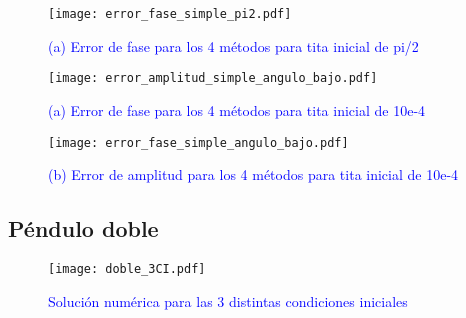 \documentclass[aps,prb,twocolumn,superscriptaddress,floatfix,longbibliography]{revtex4-2}
\newcounter{para}
\begin{document}
\begin{figure}[h]
  \texttt{[image: error\_fase\_simple\_pi2.pdf]}
  \caption{\textcolor{blue}{(a) Error de fase para los 4 métodos para tita inicial de pi/2}}
   \label{fig:error_fase_simple_pi2}
\end{figure}



\begin{figure}[h]
  \texttt{[image: error\_amplitud\_simple\_angulo\_bajo.pdf]}
  \caption{\textcolor{blue}{(a) Error de fase para los 4 métodos para tita inicial de 10e-4}}
   \label{fig:error_amplitud_simple_angulo_bajo}
\end{figure}



\begin{figure}[h]
  \texttt{[image: error\_fase\_simple\_angulo\_bajo.pdf]}
  \caption{\textcolor{blue}{(b) Error de amplitud para los 4 métodos para tita inicial de 10e-4}}
   \label{fig:error_fase_simple_angulo_bajo}
\end{figure}


\subsection{Péndulo doble}

\begin{figure}[h]
  \texttt{[image: doble\_3CI.pdf]}
  \caption{\textcolor{blue}{Solución numérica para las 3 distintas condiciones iniciales}}
   \label{fig:doble_3CI}
\end{figure}
\end{document}
